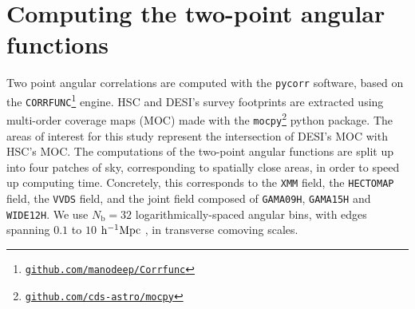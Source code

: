 \section{Computing the two-point angular functions}\label{sec:2pcf}

Two point angular correlations are computed with the \texttt{pycorr} software, based on the \texttt{CORRFUNC}\footnote{\textcolor{blue}{\href{https://github.com/manodeep/Corrfunc}{\texttt{github.com/manodeep/Corrfunc}}}} \cite{Sinha2019corrfunc1, Sinha2019corrfunc2} engine. HSC and DESI's survey footprints are extracted using multi-order coverage maps (MOC) \cite{fernique2015moc} made with the \texttt{mocpy}\footnote{\textcolor{blue}{\href{https://github.com/cds-astro/mocpy}{\texttt{github.com/cds-astro/mocpy}}}} python package. The areas of interest for this study represent the intersection of DESI's MOC with HSC's MOC.
The computations of the two-point angular functions are split up into four patches of sky, corresponding to spatially close areas, in order to speed up computing time. Concretely, this corresponds to the \texttt{XMM} field, the \texttt{HECTOMAP} field, the \texttt{VVDS} field, and the joint field composed of \texttt{GAMA09H}, \texttt{GAMA15H} and \texttt{WIDE12H}. We use $N_\mathrm{b}=32$ logarithmically-spaced angular bins, with edges spanning $0.1$ to $10$ $\mathrm{h}^{-1}\mathrm{Mpc}$ , in transverse comoving scales.

